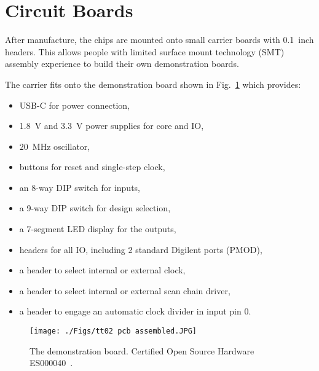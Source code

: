 \section{Circuit Boards}
\label{sec:circuit_board}
After manufacture, the chips are mounted onto small carrier boards with 0.1~inch headers. This allows people with limited surface mount technology (SMT) assembly experience to build their own demonstration boards.

The carrier fits onto the demonstration board shown in Fig.~\ref{fig:demonstration_board} which provides:
\begin{itemize}
\item USB-C for power connection,
\item \qty{1.8}{\V} and \qty{3.3}{\V} power supplies for core and IO,
\item \qty{20}{\MHz} oscillator,
\item buttons for reset and single-step clock,
\item an 8-way DIP switch for inputs,
\item a 9-way DIP switch for design selection,
\item a 7-segment LED display for the outputs,
\item headers for all IO, including 2 standard Digilent ports (PMOD),
\item a header to select internal or external clock,
\item a header to select internal or external scan chain driver,
\item a header to engage an automatic clock divider in input pin 0.
\end{itemize}

\begin{figure}[!t]
\centering
\texttt{[image: ./Figs/tt02 pcb assembled.JPG]}
\caption{The demonstration board. Certified Open Source Hardware ES000040~\cite{oshwacertification}.}
\label{fig:demonstration_board}
\end{figure}
